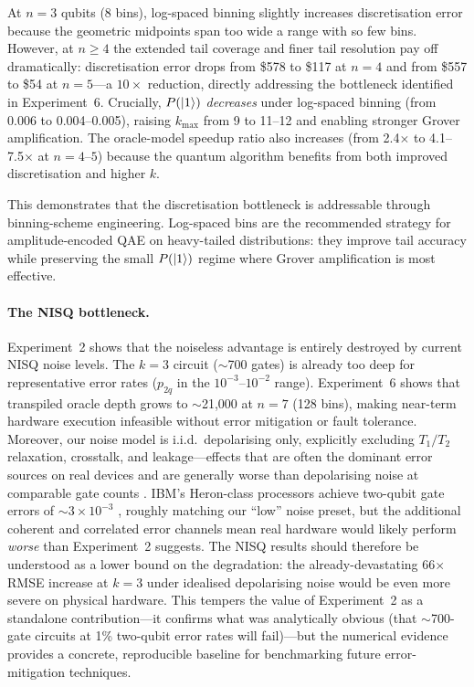 \documentclass[11pt,a4paper]{article}
\begin{document}
At $n = 3$ qubits (8 bins), log-spaced binning slightly increases discretisation error because the geometric midpoints span too wide a range with so few bins. However, at $n \geq 4$ the extended tail coverage and finer tail resolution pay off dramatically: discretisation error drops from \$578 to \$117 at $n=4$ and from \$557 to \$54 at $n=5$---a $10\times$ reduction, directly addressing the bottleneck identified in Experiment~6. Crucially, $P(\ket{1})$ \emph{decreases} under log-spaced binning (from 0.006 to 0.004--0.005), raising $k_{\max}$ from 9 to 11--12 and enabling stronger Grover amplification. The oracle-model speedup ratio also increases (from 2.4$\times$ to 4.1--7.5$\times$ at $n = 4$--$5$) because the quantum algorithm benefits from both improved discretisation and higher $k$.

This demonstrates that the discretisation bottleneck is addressable through binning-scheme engineering. Log-spaced bins are the recommended strategy for amplitude-encoded QAE on heavy-tailed distributions: they improve tail accuracy while preserving the small $P(\ket{1})$ regime where Grover amplification is most effective.

\paragraph{The NISQ bottleneck.} Experiment~2 shows that the noiseless advantage is entirely destroyed by current NISQ noise levels. The $k=3$ circuit ($\sim$700 gates) is already too deep for representative error rates ($p_{2q}$ in the $10^{-3}$--$10^{-2}$ range). Experiment~6 shows that transpiled oracle depth grows to $\sim$21,000 at $n=7$ (128 bins), making near-term hardware execution infeasible without error mitigation or fault tolerance. Moreover, our noise model is i.i.d.\ depolarising only, explicitly excluding $T_1/T_2$ relaxation, crosstalk, and leakage---effects that are often the dominant error sources on real devices and are generally worse than depolarising noise at comparable gate counts \cite{Tannu2019}. IBM's Heron-class processors achieve two-qubit gate errors of $\sim 3 \times 10^{-3}$ \cite{McKay2023}, roughly matching our ``low'' noise preset, but the additional coherent and correlated error channels mean real hardware would likely perform \emph{worse} than Experiment~2 suggests. The NISQ results should therefore be understood as a lower bound on the degradation: the already-devastating 66$\times$ RMSE increase at $k=3$ under idealised depolarising noise would be even more severe on physical hardware. This tempers the value of Experiment~2 as a standalone contribution---it confirms what was analytically obvious (that $\sim$700-gate circuits at 1\% two-qubit error rates will fail)---but the numerical evidence provides a concrete, reproducible baseline for benchmarking future error-mitigation techniques.
\end{document}
